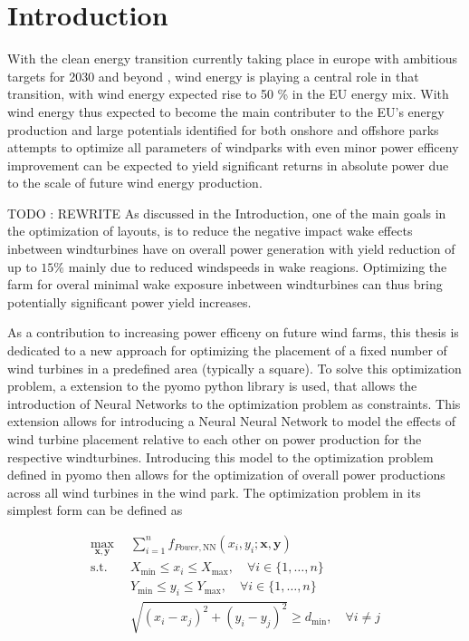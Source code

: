 
\chapter{Introduction}\label{chapter:introduction}


With the clean energy transition currently taking place in europe with ambitious targets for 2030 and beyond \cite{EU_RE_Targets_2023} , wind energy is playing a central role in that transition, with wind energy expected rise to 50 \% in the EU energy mix. \cite{ConsiliumEU_Harnessing_Wind_Power_2024}
With wind energy thus expected to become the main contributer to the EU's energy production and large potentials identified for both onshore and offshore parks \cite{EEA_Wind_Energy_Potential_2009} attempts to optimize all parameters of windparks with even minor power efficeny improvement can be expected to yield significant returns in absolute power due to the scale of future wind energy production. 


TODO : REWRITE 
As discussed in the Introduction, one of the main goals in the optimization of layouts, is to reduce the negative impact wake effects inbetween windturbines have on overall power generation with yield reduction of up to $15 \%$  mainly due to reduced windspeeds in wake reagions. Optimizing the farm for overal minimal wake exposure inbetween windturbines can thus bring potentially significant power yield increases. \cite{hou_review_2019} \cite{KIM2024123383}

As a contribution to increasing power efficeny on future wind farms, this thesis is dedicated to a new approach for optimizing the placement of a fixed number of wind turbines in a predefined area (typically a square). To solve this optimization problem, a extension to the pyomo python library is used, that allows the introduction of Neural Networks to the optimization problem as constraints. \cite{ALCANTARA2023120895} This extension allows for introducing a Neural Neural Network to model the effects of wind turbine placement relative to each other on power production for the respective windturbines. Introducing this model to the optimization problem defined in pyomo then allows for the optimization of overall power productions across all wind turbines in the wind park. The optimization problem in its simplest form can be defined as

\begin{align}
	\max_{\mathbf{x}, \mathbf{y}} & \sum_{i=1}^{n} f_{Power,\text{NN}}(x_i, y_i; \mathbf{x}, \mathbf{y}) \\
	\text{s.t.} \quad & X_{\min} \leq x_i \leq X_{\max}, \quad \forall i \in \{1, \dots, n\} \\
	& Y_{\min} \leq y_i \leq Y_{\max}, \quad \forall i \in \{1, \dots, n\} \\
	& \sqrt{(x_i - x_j)^2 + (y_i - y_j)^2} \geq d_{\min}, \quad \forall i \neq j
\end{align}

